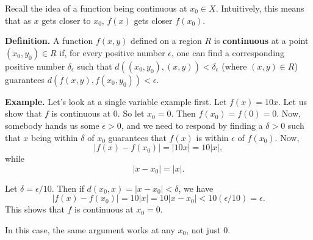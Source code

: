 \documentclass{article}
\begin{document}
Recall the idea of a function being continuous at $x_0 \in X$. Intuitively, this means that
as $x$ gets closer to $x_0$, $f(x)$ gets closer $f(x_0)$.

\textbf{Definition.} 
A function $f(x,y)$ defined on a region $R$ is \textbf{continuous} at a point $(x_0,y_0) \in R$ if, 
for every positive number $\epsilon$,  one can find a corresponding positive number $\delta_\epsilon$ such that
$d((x_0,y_0),(x,y)) < \delta_\epsilon$ (where $(x,y) \in R$) guarantees $d(f(x,y),f(x_0,y_0)) < \epsilon$. 

\textbf{Example.} 
Let's look at a single variable example first. Let $f(x) = 10x$. 
Let us show that $f$ is continuous at $0$. So let $x_0 = 0$. Then 
$f(x_0)=f(0)=0$. Now, somebody hands us some $\epsilon > 0$, and we 
need to respond by finding a $\delta > 0$ such that $x$ being within 
$\delta$ of $x_0$ guarantees that $f(x)$ is within $\epsilon$ of $f(x_0)$.
Now, 
\[|f(x)-f(x_0)| = |10x|=10|x|,\]
while
\[|x-x_0|=|x|.\]

Let $\delta = \epsilon/10$. Then if $d(x_0,x)=|x-x_0| < \delta$, we have
\[|f(x)-f(x_0)| = 10|x| = 10|x-x_0| < 10(\epsilon/10)=\epsilon.\]
This shows that $f$ is continuous at $x_0=0$.

In this case, the same argument works at any $x_0$, not just $0$.
\end{document}
